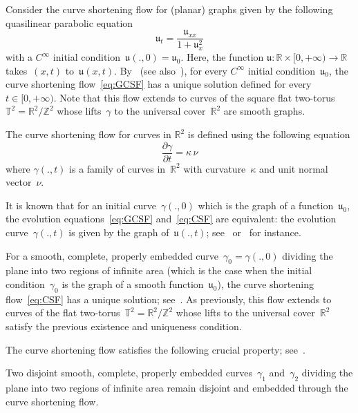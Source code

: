 \documentclass[AHL,Unicode,longabstracts,published]{cedram}
\newcommand{\Z}{\mathbb{Z}}
\newcommand{\R}{\mathbb{R}}
\newcommand{\T}{\mathbb{T}}
\newcommand{\bu}{\mathfrak{u}}
\begin{document}
\begin{defi}\label{def:CSF}
Consider the curve shortening flow for (planar) graphs given by the following quasilinear parabolic equation
\begin{equation}\label{eq:GCSF}
\bu_t=\frac{\bu_{xx}}{1+\bu_{x}^{2}}
\end{equation}
with a $C^\infty$ initial condition~$\bu(.,0)=\bu_0$. Here, the function $\bu:\R \times [0,+\infty) \to \R$ takes~$(x,t)$ to~$\bu(x,t)$. By~\cite{EH91} (see also~\cite{CZ98}), for every $C^\infty$ initial condition~$\bu_0$, the curve shortening flow~\eqref{eq:GCSF} has a unique solution defined for every $t\in[0,+\infty)$. Note that this flow extends to curves of the square flat two-torus~$\T^2=\R^2/\Z^2$ whose lifts~$\gamma$ to the universal cover~$\R^2$ are smooth graphs.

The curve shortening flow for curves in $\R^{2}$ is defined using the following equation
\begin{equation}\label{eq:CSF}
\frac{\partial \gamma}{\partial t} = \kappa \, \nu
\end{equation}
where $\gamma(.,t)$ is a family of curves in~$\R^2$ with curvature~$\kappa$ and unit normal vector~$\nu$.

It is known that for an initial curve~$\gamma(.,0)$ which is the graph of a function~$\bu_0$, the evolution equations~\eqref{eq:GCSF} and~\eqref{eq:CSF} are equivalent: the evolution curve~$\gamma(.,t)$ is given by the graph of~$\bu(.,t)$; see~\cite{EH91} or~\cite{CZ98} for instance.
\end{defi}


For a smooth, complete, properly embedded curve~$\gamma_0=\gamma(.,0)$ dividing the plane into two regions of infinite area (which is the case when the initial condition~$\gamma_0$ is the graph of a smooth function~$\bu_0$), the curve shortening flow~\eqref{eq:CSF} has a unique solution; see~\cite{CZ98}. As previously, this flow extends to curves of the flat two-torus~$\T^2=\R^2/\Z^2$ whose lifts to the universal cover~$\R^2$ satisfy the previous existence and uniqueness condition. 


The curve shortening flow satisfies the following crucial property; see~\cite{CZ98}.

\begin{theo}\label{theo:CSF}
Two disjoint smooth, complete, properly embedded curves~$\gamma_1$ and~$\gamma_2$ dividing the plane into two regions of infinite area remain disjoint and embedded through the curve shortening flow.
\end{theo}
\end{document}
